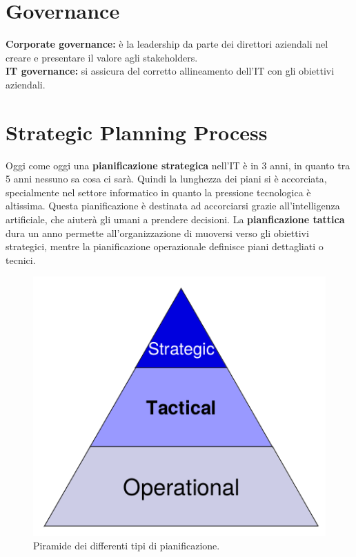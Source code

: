\section{Governance}

\textbf{Corporate governance:} è la leadership da parte dei direttori aziendali nel 
creare e presentare il valore agli stakeholders.\\
\newline
\textbf{IT governance:} si assicura del corretto allineamento dell'IT con gli 
obiettivi aziendali.



\section{Strategic Planning Process}
\label{PG:SPP}

Oggi come oggi una \textbf{pianificazione strategica} nell'IT è in 3 anni, in quanto tra 
5 anni nessuno sa cosa ci sarà. Quindi la lunghezza dei piani si è accorciata, 
specialmente nel settore informatico in quanto la pressione tecnologica è 
altissima. Questa pianificazione è destinata ad accorciarsi grazie 
all'intelligenza artificiale, che aiuterà gli umani a prendere decisioni.
La \textbf{pianficazione tattica} dura un anno permette all'organizzazione di 
muoversi verso gli obiettivi strategici, mentre la pianificazione operazionale 
definisce piani dettagliati o tecnici.

\begin{figure}[H]
        \begin{center}
                \includegraphics[scale=0.4]{res/img/planning_process}
        \end{center}
        \caption{Piramide dei differenti tipi di pianificazione.}    
\end{figure}

